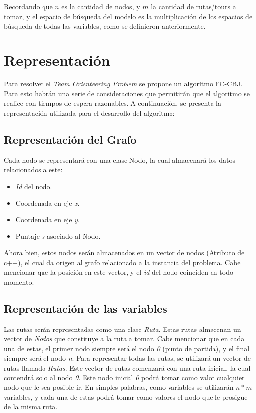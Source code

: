\documentclass[letter, 10pt]{article}
\begin{document}
Recordando que $n$ es la cantidad de nodos, y $m$ la cantidad de rutas/tours a tomar, y el espacio de búsqueda del modelo es la multiplicación de los espacios de búsqueda de todas las variables, como se definieron anteriormente.

\section{Representaci\'on}

Para resolver el \textit{Team Orienteering Problem} se propone un algoritmo FC-CBJ. Para esto habrán una serie de consideraciones que permitirán que el algoritmo se realice con tiempos de espera razonables. A continuación, se presenta la representación utilizada para el desarrollo del algoritmo:
\newpage
\subsection{Representación del Grafo}

Cada nodo se representará con una clase Nodo, la cual almacenará los datos relacionados a este:
\begin{itemize}
    \item \textit{Id} del nodo.
    \item Coordenada en eje \textit{x}.
    \item Coordenada en eje \textit{y}.
    \item Puntaje \textit{s} asociado al Nodo.
\end{itemize}

Ahora bien, estos nodos serán almacenados en un vector de nodos (Atributo de c++), el cual da origen al grafo relacionado a la instancia del problema. Cabe mencionar que la posición en este vector, y el \textit{id} del nodo coinciden en todo momento.

\subsection{Representación de las variables}

Las rutas serán representadas como una clase \textit{Ruta}. Estas rutas almacenan un vector de \textit{Nodos} que constituye a la ruta a tomar. Cabe mencionar que en cada una de estas, el primer nodo siempre será el nodo \textit{0} (punto de partida), y el final siempre será el nodo \textit{n}. 
Para representar todas las rutas, se utilizará un vector de rutas llamado \textit{Rutas}. Este vector de rutas comenzará con una ruta inicial, la cual contendrá solo al nodo \textit{0}. Este nodo inicial \textit{0} podrá tomar como valor cualquier nodo que le sea posible ir. En simples palabras, como variables se utilizarán $n*m$ variables, y cada una de estas podrá tomar como valores el nodo que le prosigue de la misma ruta.
\end{document}
